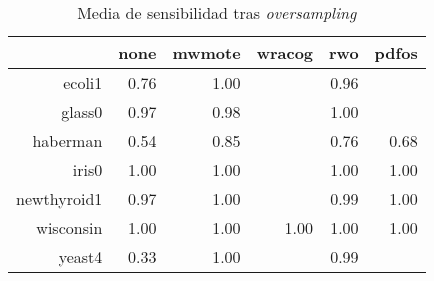 \begin{frame}
  \begin{table}[H]
  \centering
  \begin{tabular}{rrrrrr}
  \hline
  & none & mwmote & wracog & rwo & pdfos \\ 
  \hline
  ecoli1 & 0.76 & 1.00 &  & 0.96 &  \\ 
  glass0 & 0.97 & 0.98 &  & 1.00 &  \\ 
  haberman & 0.54 & 0.85 &  & 0.76 & 0.68 \\ 
  iris0 & 1.00 & 1.00 &  & 1.00 & 1.00 \\ 
  newthyroid1 & 0.97 & 1.00 &  & 0.99 & 1.00 \\ 
  wisconsin & 1.00 & 1.00 & 1.00 & 1.00 & 1.00 \\ 
  yeast4 & 0.33 & 1.00 &  & 0.99 &  \\ 
  \hline
  \end{tabular}
  \caption{Media de sensibilidad tras \textit{oversampling}}
  \end{table}
\end{frame}




